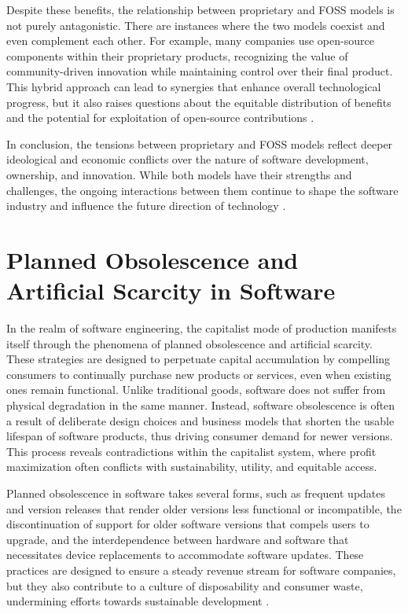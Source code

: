 \begin{refsection}
Despite these benefits, the relationship between proprietary and FOSS models is not purely antagonistic. There are instances where the two models coexist and even complement each other. For example, many companies use open-source components within their proprietary products, recognizing the value of community-driven innovation while maintaining control over their final product. This hybrid approach can lead to synergies that enhance overall technological progress, but it also raises questions about the equitable distribution of benefits and the potential for exploitation of open-source contributions \cite[pp.~99-103]{lerner2000}.

In conclusion, the tensions between proprietary and FOSS models reflect deeper ideological and economic conflicts over the nature of software development, ownership, and innovation. While both models have their strengths and challenges, the ongoing interactions between them continue to shape the software industry and influence the future direction of technology \cite[pp.~31-37]{benkler2010}.

\section{Planned Obsolescence and Artificial Scarcity in Software}

In the realm of software engineering, the capitalist mode of production manifests itself through the phenomena of planned obsolescence and artificial scarcity. These strategies are designed to perpetuate capital accumulation by compelling consumers to continually purchase new products or services, even when existing ones remain functional. Unlike traditional goods, software does not suffer from physical degradation in the same manner. Instead, software obsolescence is often a result of deliberate design choices and business models that shorten the usable lifespan of software products, thus driving consumer demand for newer versions. This process reveals contradictions within the capitalist system, where profit maximization often conflicts with sustainability, utility, and equitable access.

Planned obsolescence in software takes several forms, such as frequent updates and version releases that render older versions less functional or incompatible, the discontinuation of support for older software versions that compels users to upgrade, and the interdependence between hardware and software that necessitates device replacements to accommodate software updates. These practices are designed to ensure a steady revenue stream for software companies, but they also contribute to a culture of disposability and consumer waste, undermining efforts towards sustainable development \cite[pp.~729-749]{bulow1986economic}.


\end{refsection}
